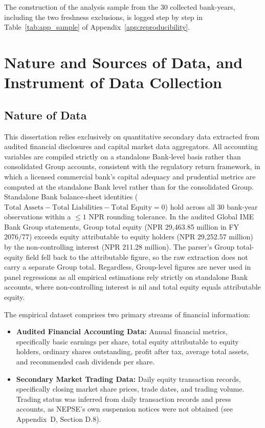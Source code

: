 The construction of the analysis sample from the 30 collected bank-years, including the two freshness exclusions, is logged step by step in Table~\ref{tab:app_sample} of Appendix~\ref{app:reproducibility}.

\section{Nature and Sources of Data, and Instrument of Data Collection}

\subsection{Nature of Data}
This dissertation relies exclusively on quantitative secondary data extracted from audited financial disclosures and capital market data aggregators. All accounting variables are compiled strictly on a standalone Bank-level basis rather than consolidated Group accounts, consistent with the regulatory return framework, in which a licensed commercial bank's capital adequacy and prudential metrics are computed at the standalone Bank level rather than for the consolidated Group. Standalone Bank balance-sheet identities ($\text{Total Assets} - \text{Total Liabilities} - \text{Total Equity} = 0$) hold across all 30 bank-year observations within a $\le 1$ NPR rounding tolerance. In the audited Global IME Bank Group statements, Group total equity (NPR 29,463.85 million in FY 2076/77) exceeds equity attributable to equity holders (NPR 29,252.57 million) by the non-controlling interest (NPR 211.28 million). The parser's Group total-equity field fell back to the attributable figure, so the raw extraction does not carry a separate Group total. Regardless, Group-level figures are never used in panel regressions as all empirical estimations rely strictly on standalone Bank accounts, where non-controlling interest is nil and total equity equals attributable equity.

The empirical dataset comprises two primary streams of financial information:
\begin{itemize}
    \item \textbf{Audited Financial Accounting Data:} Annual financial metrics, specifically basic earnings per share, total equity attributable to equity holders, ordinary shares outstanding, profit after tax, average total assets, and recommended cash dividends per share.
    \item \textbf{Secondary Market Trading Data:} Daily equity transaction records, specifically closing market share prices, trade dates, and trading volume. Trading status was inferred from daily transaction records and press accounts, as NEPSE's own suspension notices were not obtained (see Appendix~D, Section D.8).
\end{itemize}

